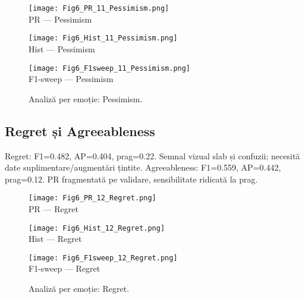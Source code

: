 \begin{figure}[H]
  \centering
  \begin{minipage}[t]{0.32\textwidth}\centering
    \texttt{[image: Fig6\_PR\_11\_Pessimism.png]}\\[-1mm]
    {\scriptsize PR — Pessimism}
  \end{minipage}\hfill
  \begin{minipage}[t]{0.32\textwidth}\centering
    \texttt{[image: Fig6\_Hist\_11\_Pessimism.png]}\\[-1mm]
    {\scriptsize Hist — Pessimism}
  \end{minipage}\hfill
    \begin{minipage}[t]{0.32\textwidth}\centering
    \texttt{[image: Fig6\_F1sweep\_11\_Pessimism.png]}\\[-1mm]
    {\scriptsize F1-sweep — Pessimism}
  \end{minipage}
  \caption{Analiză per emoție: Pessimism.}
  \label{fig:c6-pessimism}
\end{figure}

\subsection{Regret și Agreeableness}
\noindent Regret: F1=0.482, AP=0.404, prag=0.22. Semnal vizual slab și confuzii; necesită date suplimentare/augmentări țintite.
\noindent Agreeableness: F1=0.559, AP=0.442, prag=0.12. PR fragmentată pe validare, sensibilitate ridicată la prag.

\begin{figure}[H]
  \centering
  \begin{minipage}[t]{0.32\textwidth}\centering
    \texttt{[image: Fig6\_PR\_12\_Regret.png]}\\[-1mm]
    {\scriptsize PR — Regret}
  \end{minipage}\hfill
  \begin{minipage}[t]{0.32\textwidth}\centering
    \texttt{[image: Fig6\_Hist\_12\_Regret.png]}\\[-1mm]
    {\scriptsize Hist — Regret}
  \end{minipage}\hfill
  \begin{minipage}[t]{0.32\textwidth}\centering
    \texttt{[image: Fig6\_F1sweep\_12\_Regret.png]}\\[-1mm]
    {\scriptsize F1-sweep — Regret}
  \end{minipage}
  \caption{Analiză per emoție: Regret.}
  \label{fig:c6-regret}
\end{figure}


